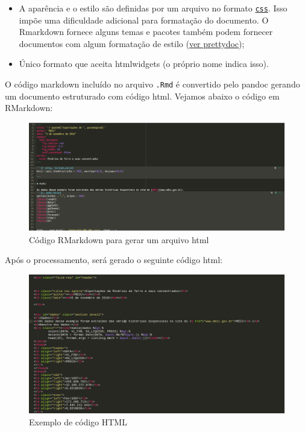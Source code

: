 \documentclass[]{book}
\begin{document}
\begin{itemize}
\item
  A aparência e o estilo são definidas por um arquivo no formato
  \href{https://pt.wikipedia.org/wiki/Cascading_Style_Sheets}{\texttt{css}}.
  Isso impõe uma dificuldade adicional para formatação do documento. O
  Rmarkdown fornece alguns temas e pacotes também podem fornecer
  documentos com algum formatação de estilo
  (\href{https://www.r-bloggers.com/creating-pretty-documents-with-the-prettydoc-package/}{ver
  prettydoc});
\item
  Único formato que aceita htmlwidgets (o próprio nome indica isso).
\end{itemize}

O código markdown incluído no arquivo \texttt{.Rmd} é convertido pelo
pandoc gerando um documento estruturado com código html. Vejamos abaixo
o código em RMarkdown:

\begin{figure}
\centering
\includegraphics{images/exemplo_html_rmdcode.png}
\caption{Código RMarkdown para gerar um arquivo html}
\end{figure}

Após o processamento, será gerado o seguinte código html:

\begin{figure}
\centering
\includegraphics{images/exemplo_html_code.png}
\caption{Exemplo de código HTML}
\end{figure}
\end{document}
